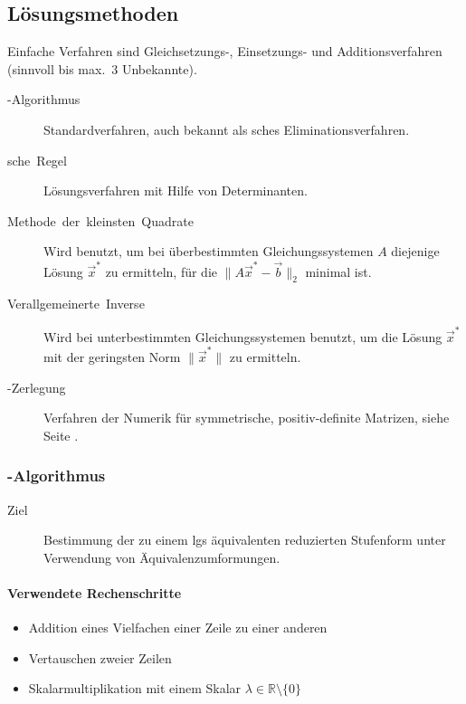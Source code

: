 \subsection{Lösungsmethoden}

Einfache Verfahren sind Gleichsetzungs-, Einsetzungs- und Additionsverfahren (sinnvoll bis max.~3 Unbekannte).
\begin{description}
  \item [{-Algorithmus}]
	Standardverfahren, auch bekannt als sches Eliminationsverfahren.
  \item [{sche~Regel}]
	Lösungsverfahren mit Hilfe von Determinanten.
  \item [{Methode~der~kleinsten~Quadrate}]
	Wird benutzt, um bei überbestimmten Gleichungssystemen $A$ diejenige Lösung $\vec x^*$ zu ermitteln, für die $\lVert A\vec x^* - \vec b \rVert_2$ minimal ist.
  \item [{Verallgemeinerte~Inverse}]
	Wird bei unterbestimmten Gleichungssystemen benutzt, um die Lösung $\vec x^*$ mit der geringsten Norm $\lVert \vec x^* \rVert$ zu ermitteln.
\ifincludeincomplete
  \item [{-Zerlegung}]
	Verfahren der Numerik für symmetrische, positiv-de\-fi\-ni\-te Matrizen, siehe Seite \pageref{sec:Cholesky-Zerlegung}.
\fi
\end{description}

\subsubsection{\protect{}-Algorithmus}

\begin{description}
  \item [{Ziel}] Bestimmung der zu einem \gls{lgs} äquivalenten reduzierten Stufenform unter Verwendung von Äquivalenzumformungen.
\end{description}

\paragraph*{Verwendete Rechenschritte}
\begin{itemize}
  \item Addition eines Vielfachen einer Zeile zu einer anderen
  \item Vertauschen zweier Zeilen
  \item Skalarmultiplikation mit einem Skalar $\lambda\in\mathbb{R}\setminus\{0\}$
\end{itemize}

